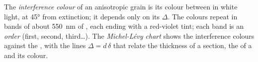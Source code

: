 \begin{definition}\label{def:b1:optical-mineralogy:interference-colour}
The \emph{interference colour} of an anisotropic
grain is its colour between  in white light, at \ang{45} from
extinction; it depends only on its  $\Delta$. The colours repeat
in bands of about \qty{550}{nm} of , each ending with a red-violet
tint; each band is an \emph{order}
(first, second, third\dots). The \emph{Michel-Lévy
chart} shows the interference colours against the
, with the lines $\Delta = d\,\delta$ that relate the thickness of
a section, the  of a  and its colour.
\end{definition}

